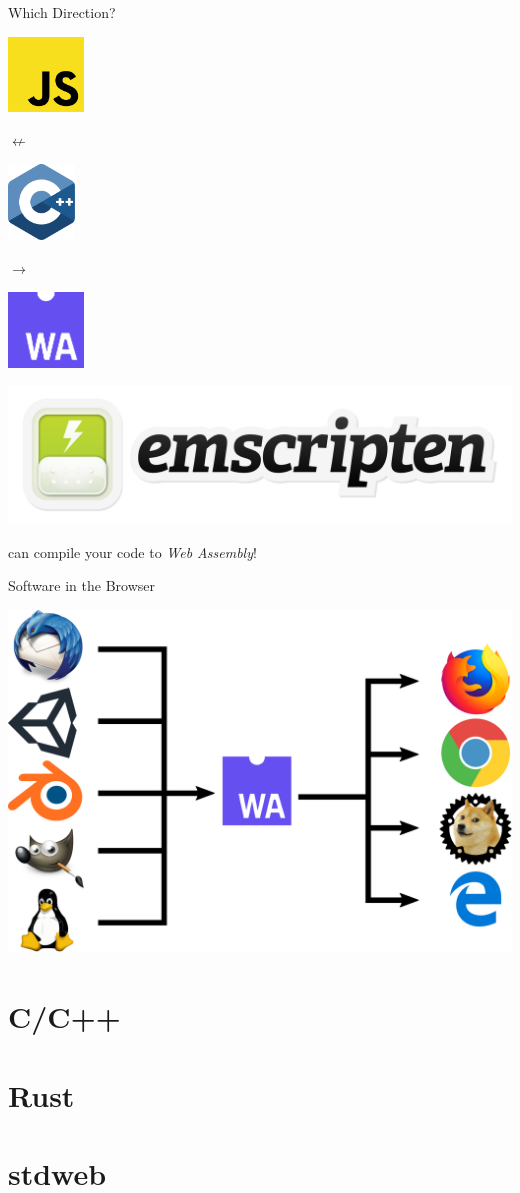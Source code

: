 \documentclass{lug}
\newcommand{\pmidg}[1]{\parbox{\widthof{#1}}{#1}}
\begin{document}
\begin{frame}{Which Direction?}
    \begin{center}
        {
            \Huge
            \pmidg{\includegraphics[height=2cm]{graphics/js_logo}}
            {\color{red}$\nleftarrow$} 
            \pmidg{\includegraphics[height=2cm]{graphics/c_logo}}
            {\color{green}$\rightarrow$}
            \pmidg{\includegraphics[height=2cm]{graphics/wasm_logo}}
        }

        \vspace{2cm}

        \pmidg{\includegraphics[height=4ex]{graphics/emscripten_logo}}
        can compile your code to \textit{Web Assembly}!
    \end{center}
\end{frame}

\begin{frame}{Software in the Browser}
    \pmidg{\includegraphics[width=\columnwidth]{graphics/wasm_chain}}
\end{frame}

\renewcommand{\secimage}{graphics/c_logo}
\section{C/C++}

\renewcommand{\secimage}{graphics/rust_logo}
\section{Rust}

\renewcommand{\secimage}{graphics/stdweb_logo}
\section{stdweb}
\end{document}
